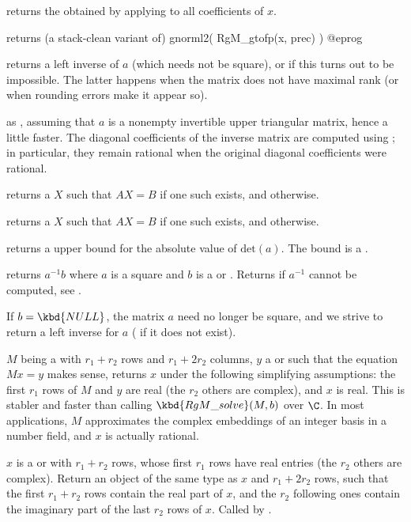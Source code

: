  returns the  obtained by
applying  to all coefficients of $x$.

 returns (a stack-clean variant of)
\bprog
  gnorml2( RgM_gtofp(x, prec) )
@eprog


 returns a left inverse of $a$ (which needs not be
square), or  if this turns out to be impossible. The latter
happens when the matrix does not have maximal rank (or when rounding errors
make it appear so).

 as , assuming that $a$ is a
nonempty invertible upper triangular matrix, hence a little faster. The
diagonal coefficients of the inverse matrix are computed using
; in particular, they remain rational when
the original diagonal coefficients were rational.

 returns a  $X$ such that
$A X = B$ if one such exists, and  otherwise.

 returns a  $X$ such that
$A X = B$ if one such exists, and  otherwise.

 returns a upper bound for the absolute
value of $\text{det}(a)$. The bound is a .

 returns $a^{-1}b$ where $a$ is a square
 and $b$ is a  or . Returns  if $a^{-1}$
cannot be computed, see .

If $b = \kbd{NULL}$, the matrix $a$ need no longer be square, and we strive
to return a left inverse for $a$ ( if it does not exist).

 $M$ being a 
with $r_1+r_2$ rows and $r_1+2r_2$ columns, $y$ a  or 
such that the equation $Mx = y$ makes sense, returns $x$ under the following
simplifying assumptions: the first $r_1$ rows of $M$ and $y$ are real
(the $r_2$ others are complex), and $x$ is real. This is stabler and faster
than calling $\kbd{RgM\_solve}(M, b)$ over $\C$. In most applications,
$M$ approximates the complex embeddings of an integer basis in a number
field, and $x$ is actually rational.

 $x$ is a  or
 with $r_1 + r_2$ rows, whose first $r_1$ rows have real entries
(the $r_2$ others are complex). Return an object of the same type as
$x$ and $r_1 + 2r_2$ rows, such that the first $r_1 + r_2$ rows contain
the real part of $x$, and the $r_2$ following ones contain the imaginary part
of the last $r_2$ rows of $x$. Called by .

